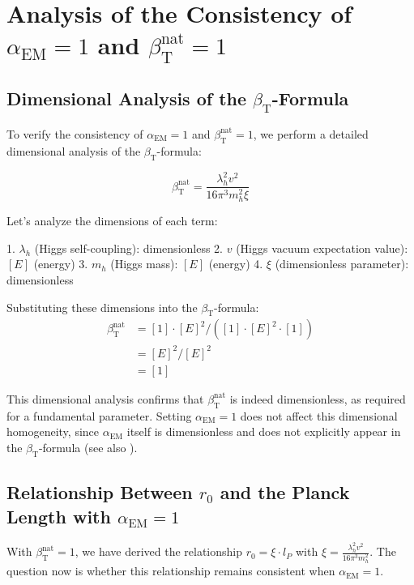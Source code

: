 \documentclass[12pt,a4paper]{article}
\newcommand{\alphaEM}{\alpha_{\text{EM}}}
\newcommand{\betaT}{\beta_{\text{T}}}
\begin{document}
	\section{Analysis of the Consistency of \(\alphaEM = 1\) and \(\betaT^{\text{nat}} = 1\)}
	\label{sec:consistency}
	
	\subsection{Dimensional Analysis of the \(\betaT\)-Formula}
	\label{subsec:dimensional_analysis}
	
	To verify the consistency of \(\alphaEM = 1\) and \(\betaT^{\text{nat}} = 1\), we perform a detailed dimensional analysis of the \(\betaT\)-formula:
	
	\begin{equation}
		\betaT^{\text{nat}} = \frac{\lambda_h^2 v^2}{16\pi^3 m_h^2 \xi}
	\end{equation}
	
	Let's analyze the dimensions of each term:
	
	1. \(\lambda_h\) (Higgs self-coupling): dimensionless
	2. \(v\) (Higgs vacuum expectation value): \([E]\) (energy)
	3. \(m_h\) (Higgs mass): \([E]\) (energy)
	4. \(\xi\) (dimensionless parameter): dimensionless
	
	Substituting these dimensions into the \(\betaT\)-formula:
	\begin{align}
		\betaT^{\text{nat}} &= [1] \cdot [E]^2 / ([1] \cdot [E]^2 \cdot [1]) \\
		&= [E]^2 / [E]^2 \\
		&= [1]
	\end{align}
	
	This dimensional analysis confirms that \(\betaT^{\text{nat}}\) is indeed dimensionless, as required for a fundamental parameter. Setting \(\alphaEM = 1\) does not affect this dimensional homogeneity, since \(\alphaEM\) itself is dimensionless and does not explicitly appear in the \(\betaT\)-formula (see also \cite{pascher_params_2025}).
	
	\subsection{Relationship Between \(r_0\) and the Planck Length with \(\alphaEM = 1\)}
	\label{subsec:r0_planck}
	
	With \(\betaT^{\text{nat}} = 1\), we have derived the relationship \(r_0 = \xi \cdot l_P\) with \(\xi = \frac{\lambda_h^2 v^2}{16\pi^3 m_h^2}\). The question now is whether this relationship remains consistent when \(\alphaEM = 1\).
	
\end{document}

